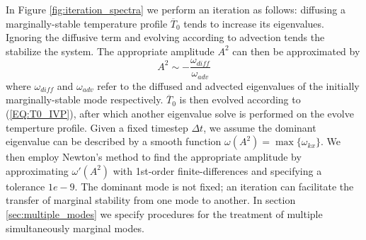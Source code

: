 \documentclass[twocolumn,showpacs,amsmath,amssymb]{revtex4}
\def\bar{\overline}
\begin{document}
In Figure \ref{fig:iteration_spectra} we perform an iteration as follows: diffusing a marginally-stable temperature profile $\bar{T}_0$ tends to increase its eigenvalues. Ignoring the diffusive term and evolving according to advection tends the stabilize the system. The appropriate amplitude $A^2$ can then be approximated by
\begin{equation}
    A^2 \sim -\frac{\omega_{diff}}{\omega_{adv}}
\end{equation}
where $\omega_{diff}$ and $\omega_{adv}$ refer to the diffused and advected eigenvalues of the initially marginally-stable mode respectively. $\bar{T}_0$ is then evolved according to (\ref{EQ:T0_IVP}), after which another eigenvalue solve is performed on the evolve temperture profile. Given a fixed timestep $\Delta t$, we assume the dominant eigenvalue can be described by a smooth function $\omega (A^2) = \max \{ \omega_{kx} \}$. We then employ Newton's method to find the appropriate amplitude by approximating $\omega'(A^2)$ with 1st-order finite-differences and specifying a tolerance $1e-9$. The dominant mode is not fixed; an iteration can facilitate the transfer of marginal stability from one mode to another. In section \ref{sec:multiple_modes} we specify procedures for the treatment of multiple simultaneously marginal modes.
\end{document}
